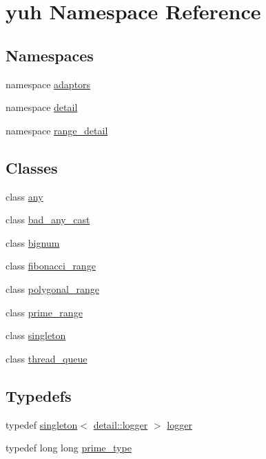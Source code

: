 \hypertarget{namespaceyuh}{\section{yuh \-Namespace \-Reference}
\label{d5/d2b/namespaceyuh}
}
\subsection*{\-Namespaces}
\begin{DoxyCompactItemize}
\item 
namespace \hyperlink{namespaceyuh_1_1adaptors}{adaptors}
\item 
namespace \hyperlink{namespaceyuh_1_1detail}{detail}
\item 
namespace \hyperlink{namespaceyuh_1_1range__detail}{range\-\_\-detail}
\end{DoxyCompactItemize}
\subsection*{\-Classes}
\begin{DoxyCompactItemize}
\item 
class \hyperlink{classyuh_1_1any}{any}
\item 
class \hyperlink{classyuh_1_1bad__any__cast}{bad\-\_\-any\-\_\-cast}
\item 
class \hyperlink{classyuh_1_1bignum}{bignum}
\item 
class \hyperlink{classyuh_1_1fibonacci__range}{fibonacci\-\_\-range}
\item 
class \hyperlink{classyuh_1_1polygonal__range}{polygonal\-\_\-range}
\item 
class \hyperlink{classyuh_1_1prime__range}{prime\-\_\-range}
\item 
class \hyperlink{classyuh_1_1singleton}{singleton}
\item 
class \hyperlink{classyuh_1_1thread__queue}{thread\-\_\-queue}
\end{DoxyCompactItemize}
\subsection*{\-Typedefs}
\begin{DoxyCompactItemize}
\item 
typedef \hyperlink{classyuh_1_1singleton}{singleton}$<$ \hyperlink{classyuh_1_1detail_1_1logger}{detail\-::logger} $>$ \hyperlink{namespaceyuh_a3ab03e295f13e50ad34282511114d186}{logger}
\item 
typedef long long \hyperlink{namespaceyuh_af542f8440602da42322ddb7ea8242336}{prime\-\_\-type}
\end{DoxyCompactItemize}
